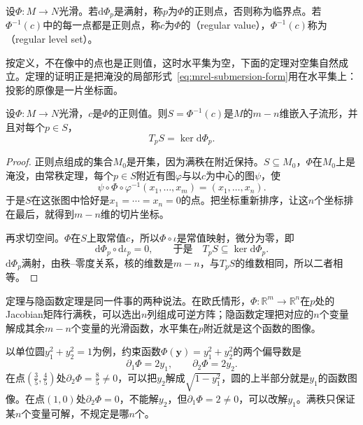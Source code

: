 \begin{definition}[正则值与正则水平集]
\label{def:mrel-regular-value}
设$\Phi:M\to N$光滑。若$\mathrm d\Phi_p$是满射，称$p$为$\Phi$的正则点，否则称为临界点。若$\Phi^{-1}(c)$中的每一点都是正则点，称$c$为$\Phi$的（regular value），$\Phi^{-1}(c)$称为（regular level set）。
\end{definition}

按定义，不在像中的点也是正则值，这时水平集为空，下面的定理对空集自然成立。定理的证明正是把淹没的局部形式~\eqref{eq:mrel-submersion-form}用在水平集上：投影的原像是一片坐标面。

\begin{theorem}[正则水平集定理]
\label{thm:mrel-regular-level-set}
设$\Phi:M\to N$光滑，$c$是$\Phi$的正则值。则$S=\Phi^{-1}(c)$是$M$的$m-n$维嵌入子流形，并且对每个$p\in S$，
\begin{equation}
T_pS=\ker\mathrm d\Phi_p .
\label{eq:mrel-level-tangent}
\end{equation}
\end{theorem}

\begin{proof}
正则点组成的集合$M_0$是开集，因为满秩在附近保持。$S\subseteq M_0$，$\Phi$在$M_0$上是淹没，由常秩定理，每个$p\in S$附近有图$\varphi$与以$c$为中心的图$\psi$，使
\[
\psi\circ\Phi\circ\varphi^{-1}(x_1,\ldots,x_m)=(x_1,\ldots,x_n).
\]
于是$S$在这张图中恰好是$x_1=\cdots=x_n=0$的点。把坐标重新排序，让这$n$个坐标排在最后，就得到$m-n$维的切片坐标。

再求切空间。$\Phi$在$S$上取常值$c$，所以$\Phi\circ\iota$是常值映射，微分为零，即
\[
\mathrm d\Phi_p\circ\mathrm d\iota_p=0,\qquad\text{于是}\quad T_pS\subseteq\ker\mathrm d\Phi_p.
\]
$\mathrm d\Phi_p$满射，由秩--零度关系，核的维数是$m-n$，与$T_pS$的维数相同，所以二者相等。
\end{proof}

定理与隐函数定理是同一件事的两种说法。在欧氏情形，$\Phi:\mathbb R^m\to\mathbb R^n$在$p$处的Jacobian矩阵行满秩，可以选出$n$列组成可逆方阵；隐函数定理把对应的$n$个变量解成其余$m-n$个变量的光滑函数，水平集在$p$附近就是这个函数的图像。

以单位圆$y_1^2+y_2^2=1$为例，约束函数$\Phi(\bm y)=y_1^2+y_2^2$的两个偏导数是
\[
\partial_1\Phi=2y_1,\qquad\partial_2\Phi=2y_2.
\]
在点$(\tfrac35,\tfrac45)$处$\partial_2\Phi=\tfrac85\neq0$，可以把$y_2$解成$\sqrt{1-y_1^2}$，圆的上半部分就是$y_1$的函数图像。在点$(1,0)$处$\partial_2\Phi=0$，不能解$y_2$，但$\partial_1\Phi=2\neq0$，可以改解$y_1$。满秩只保证某$n$个变量可解，不规定是哪$n$个。


